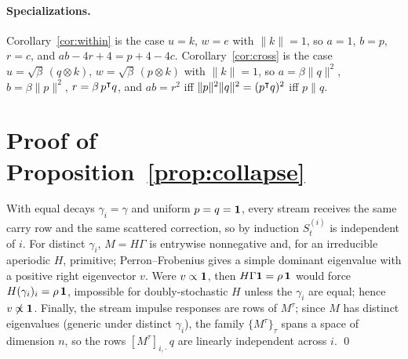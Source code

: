 \documentclass[11pt,letterpaper,logo]{yalearxiv}
\begin{document}
\paragraph{Specializations.}
Corollary~\ref{cor:within} is the case $u = k$, $w = e$ with $\|k\|=1$, so $a = 1$,
$b = p$, $r = c$, and $ab - 4r + 4 = p + 4 - 4c$. Corollary~\ref{cor:cross} is the case
$u = \sqrt\beta\,(q\otimes k)$, $w = \sqrt\beta\,(p\otimes k)$ with $\|k\|=1$, so
$a = \beta\|q\|^2$, $b = \beta\|p\|^2$, $r = \beta\, p^{\intercal}q$, and $ab = r^2$ iff
$\|p\|^2\|q\|^2 = (p^{\intercal}q)^2$ iff $p \parallel q$.


\section{Proof of Proposition~\ref{prop:collapse}}
\label{app:collapse}

With equal decays $\gamma_i = \gamma$ and uniform $p = q = \mathbf 1$, every stream receives the
same carry row and the same scattered correction, so by induction $S_t^{(i)}$ is independent
of $i$. For distinct $\gamma_i$, $M = H\Gamma$ is entrywise nonnegative and, for an
irreducible aperiodic $H$, primitive; Perron--Frobenius gives a simple dominant eigenvalue
with a positive right eigenvector $v$. Were $v \propto \mathbf 1$, then
$H\Gamma\mathbf 1 = \rho\,\mathbf 1$ would force $H(\gamma_i)_i = \rho\,\mathbf 1$, impossible for
doubly-stochastic $H$ unless the $\gamma_i$ are equal; hence $v \not\propto \mathbf 1$. Finally,
the stream impulse responses are rows of $M^\tau$; since $M$ has distinct eigenvalues
(generic under distinct $\gamma_i$), the family $\{M^\tau\}_\tau$ spans a space of dimension
$n$, so the rows $[M^\tau]_{i,\cdot}\,q$ are linearly independent across $i$. \qed




\end{document}

